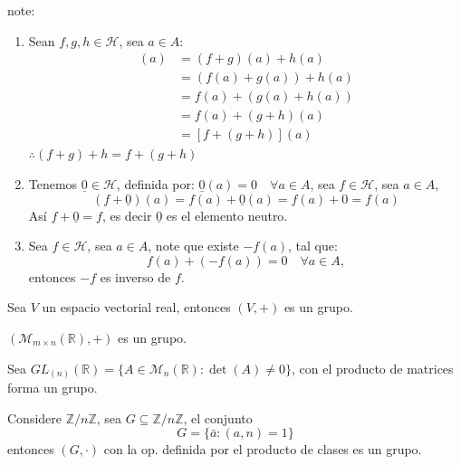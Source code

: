 \begin{enefecto} note:
	\begin{enumerate}[label=\roman*), font=\normalfont]
		\item Sean $f, g, h \in \mathcal{H}$, sea $a \in A$:
		      \begin{align*}
			      [(f+g)+h](a) & = (f+g)(a) + h(a)      \\
			                   & = (f(a) + g(a)) + h(a) \\
			                   & = f(a) + (g(a) + h(a)) \\
			                   & = f(a) + (g+h)(a)      \\
			                   & = [f+(g+h)](a)
		      \end{align*}
		      $\therefore (f+g)+h = f+(g+h)$

		\item Tenemos $\underline{0} \in \mathcal{H}$, definida por: $\underline{0}(a) = 0 \quad \forall a \in A$, sea $f \in \mathcal{H}$, sea $a \in A$,
		      \begin{equation*}
			      (f+\underline{0})(a) = f(a) + \underline{0}(a) = f(a) + 0 = f(a)
		      \end{equation*}
		      Así $f+\underline{0} = f$, es decir $\underline{0}$ es el elemento neutro.

		\item Sea $f \in \mathcal{H}$, sea $a \in A$, note que existe $-f(a)$, tal que:
		      \begin{equation*}
			      f(a) + (-f(a)) = 0 \quad \forall a \in A,
		      \end{equation*}
		      entonces $-f$ es inverso de $f$.
	\end{enumerate}
\end{enefecto}

\begin{eje}
	Sea $V$ un espacio vectorial real, entonces $(V, +)$ es un grupo.
\end{eje}

\begin{eje}
	$(\mathcal{M}_{m \times n}(\mathbb{R}), +)$ es un grupo.
\end{eje}

\begin{eje}
	Sea $GL_{(n)}(\mathbb{R}) = \{ A \in \mathcal{M}_n(\mathbb{R}) : \det(A) \neq 0 \}$, con el producto de matrices forma un grupo.
\end{eje}

\begin{eje}
	Considere $\mathbb{Z}/n\mathbb{Z}$, sea $G \subseteq \mathbb{Z}/n\mathbb{Z}$, el conjunto
	\begin{equation*}
		G = \{ \bar{a} : (a, n) = 1 \}
	\end{equation*}
	entonces $(G, \cdot)$ con la op. definida por el producto de clases es un grupo.
\end{eje}

